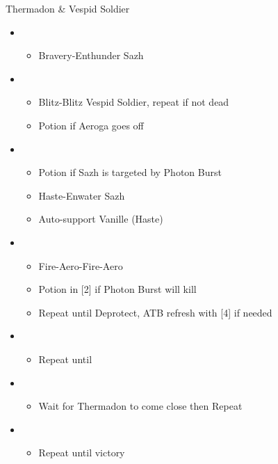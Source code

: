 	\begin{battle}[1:05]{Thermadon \& Vespid Soldier}
		\begin{itemize}
			\item \first
			      \begin{itemize}
				      \item Bravery-Enthunder Sazh
			      \end{itemize}
			\item \sixth
			      \begin{itemize}
				      \item Blitz-Blitz Vespid Soldier, repeat if not dead
				      \item Potion if Aeroga goes off
			      \end{itemize}
			\item \first
			      \begin{itemize}
				      \item Potion if Sazh is targeted by Photon Burst
				      \item Haste-Enwater Sazh
				      \item Auto-support Vanille (Haste)
			      \end{itemize}
			\item \fifth
			      \begin{itemize}
				      \item Fire-Aero-Fire-Aero
				      \item Potion in [2] if Photon Burst will kill
				      \item Repeat until Deprotect, ATB refresh with [4] if needed
			      \end{itemize}
			\item \fourth
			      \begin{itemize}
				      \item Repeat until \stagger
			      \end{itemize}
			\item \second
			      \begin{itemize}
				      \item Wait for Thermadon to come close then Repeat
			      \end{itemize}
			\item \third
			      \begin{itemize}
				      \item Repeat until victory
			      \end{itemize}
		\end{itemize}
	\end{battle}
